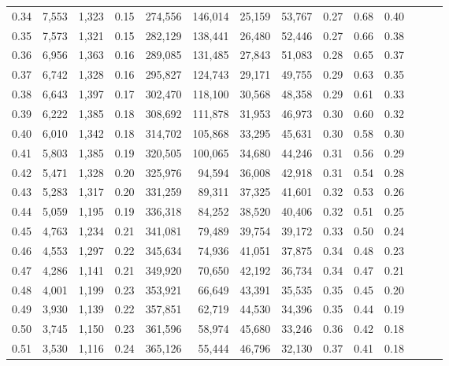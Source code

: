 \begin{tabular}{rrrrrrrrrrrrrr}
0.34 &   7,553 &  1,323 &  0.15 &  274,556 &  146,014 &  25,159 &  53,767 &  0.27 &  0.68 &      0.40 \\
0.35 &   7,573 &  1,321 &  0.15 &  282,129 &  138,441 &  26,480 &  52,446 &  0.27 &  0.66 &      0.38 \\
0.36 &   6,956 &  1,363 &  0.16 &  289,085 &  131,485 &  27,843 &  51,083 &  0.28 &  0.65 &      0.37 \\
0.37 &   6,742 &  1,328 &  0.16 &  295,827 &  124,743 &  29,171 &  49,755 &  0.29 &  0.63 &      0.35 \\
0.38 &   6,643 &  1,397 &  0.17 &  302,470 &  118,100 &  30,568 &  48,358 &  0.29 &  0.61 &      0.33 \\
0.39 &   6,222 &  1,385 &  0.18 &  308,692 &  111,878 &  31,953 &  46,973 &  0.30 &  0.60 &      0.32 \\
0.40 &   6,010 &  1,342 &  0.18 &  314,702 &  105,868 &  33,295 &  45,631 &  0.30 &  0.58 &      0.30 \\
0.41 &   5,803 &  1,385 &  0.19 &  320,505 &  100,065 &  34,680 &  44,246 &  0.31 &  0.56 &      0.29 \\
0.42 &   5,471 &  1,328 &  0.20 &  325,976 &   94,594 &  36,008 &  42,918 &  0.31 &  0.54 &      0.28 \\
0.43 &   5,283 &  1,317 &  0.20 &  331,259 &   89,311 &  37,325 &  41,601 &  0.32 &  0.53 &      0.26 \\
0.44 &   5,059 &  1,195 &  0.19 &  336,318 &   84,252 &  38,520 &  40,406 &  0.32 &  0.51 &      0.25 \\
0.45 &   4,763 &  1,234 &  0.21 &  341,081 &   79,489 &  39,754 &  39,172 &  0.33 &  0.50 &      0.24 \\
0.46 &   4,553 &  1,297 &  0.22 &  345,634 &   74,936 &  41,051 &  37,875 &  0.34 &  0.48 &      0.23 \\
0.47 &   4,286 &  1,141 &  0.21 &  349,920 &   70,650 &  42,192 &  36,734 &  0.34 &  0.47 &      0.21 \\
0.48 &   4,001 &  1,199 &  0.23 &  353,921 &   66,649 &  43,391 &  35,535 &  0.35 &  0.45 &      0.20 \\
0.49 &   3,930 &  1,139 &  0.22 &  357,851 &   62,719 &  44,530 &  34,396 &  0.35 &  0.44 &      0.19 \\
0.50 &   3,745 &  1,150 &  0.23 &  361,596 &   58,974 &  45,680 &  33,246 &  0.36 &  0.42 &      0.18 \\
0.51 &   3,530 &  1,116 &  0.24 &  365,126 &   55,444 &  46,796 &  32,130 &  0.37 &  0.41 &      0.18 \\

\end{tabular}
